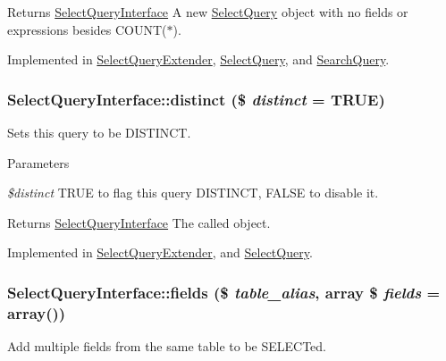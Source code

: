 \begin{DoxyReturn}{Returns}
\hyperlink{interfaceSelectQueryInterface}{SelectQueryInterface} A new \hyperlink{classSelectQuery}{SelectQuery} object with no fields or expressions besides COUNT($\ast$). 
\end{DoxyReturn}


Implemented in \hyperlink{classSelectQueryExtender_a4c222f9407cc787f41b49be4b8ee26a5}{SelectQueryExtender}, \hyperlink{classSelectQuery_a7d2e665bede18c709f677033e04db55e}{SelectQuery}, and \hyperlink{classSearchQuery_a01dea1649b1e99312abf12760b1b89e2}{SearchQuery}.\hypertarget{interfaceSelectQueryInterface_aae70694b2ee2b596a7b7d3e2c25814ee}{
\subsubsection[{distinct}]{\setlength{\rightskip}{0pt plus 5cm}SelectQueryInterface::distinct (\$ {\em distinct} = {\ttfamily TRUE})}}
\label{interfaceSelectQueryInterface_aae70694b2ee2b596a7b7d3e2c25814ee}
Sets this query to be DISTINCT.


\begin{DoxyParams}{Parameters}
\item[{\em \$distinct}]TRUE to flag this query DISTINCT, FALSE to disable it. \end{DoxyParams}
\begin{DoxyReturn}{Returns}
\hyperlink{interfaceSelectQueryInterface}{SelectQueryInterface} The called object. 
\end{DoxyReturn}


Implemented in \hyperlink{classSelectQueryExtender_a8e0cb58f3c0b4e6d535bf75703aad7bc}{SelectQueryExtender}, and \hyperlink{classSelectQuery_a9d76d503d9769768f5d20cf1793c670b}{SelectQuery}.\hypertarget{interfaceSelectQueryInterface_a7e5fcf83e82fe4f5b97d60bfccf2bb7f}{
\subsubsection[{fields}]{\setlength{\rightskip}{0pt plus 5cm}SelectQueryInterface::fields (\$ {\em table\_\-alias}, \/  array \$ {\em fields} = {\ttfamily array()})}}
\label{interfaceSelectQueryInterface_a7e5fcf83e82fe4f5b97d60bfccf2bb7f}
Add multiple fields from the same table to be SELECTed.

